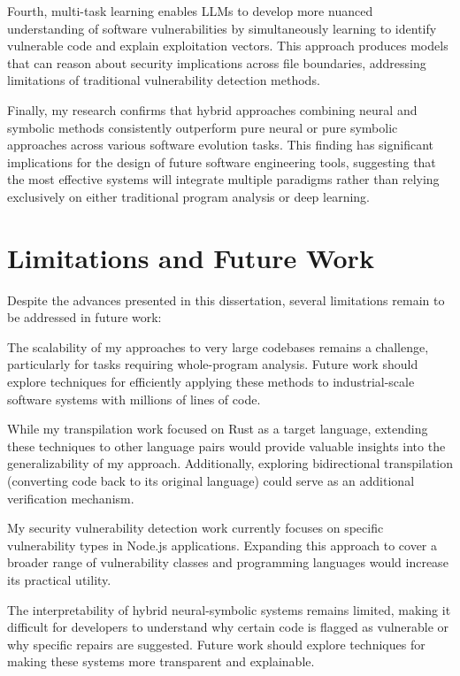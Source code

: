 Fourth, multi-task learning enables LLMs to develop more nuanced understanding of software vulnerabilities by simultaneously learning to identify vulnerable code and explain exploitation vectors. This approach produces models that can reason about security implications across file boundaries, addressing limitations of traditional vulnerability detection methods.

Finally, my research confirms that hybrid approaches combining neural and symbolic methods consistently outperform pure neural or pure symbolic approaches across various software evolution tasks. This finding has significant implications for the design of future software engineering tools, suggesting that the most effective systems will integrate multiple paradigms rather than relying exclusively on either traditional program analysis or deep learning.

\section{Limitations and Future Work}

Despite the advances presented in this dissertation, several limitations remain to be addressed in future work:

The scalability of my approaches to very large codebases remains a challenge, particularly for tasks requiring whole-program analysis. Future work should explore techniques for efficiently applying these methods to industrial-scale software systems with millions of lines of code.

While my transpilation work focused on Rust as a target language, extending these techniques to other language pairs would provide valuable insights into the generalizability of my approach. Additionally, exploring bidirectional transpilation (converting code back to its original language) could serve as an additional verification mechanism.

My security vulnerability detection work currently focuses on specific vulnerability types in Node.js applications. Expanding this approach to cover a broader range of vulnerability classes and programming languages would increase its practical utility.

The interpretability of hybrid neural-symbolic systems remains limited, making it difficult for developers to understand why certain code is flagged as vulnerable or why specific repairs are suggested. Future work should explore techniques for making these systems more transparent and explainable.

